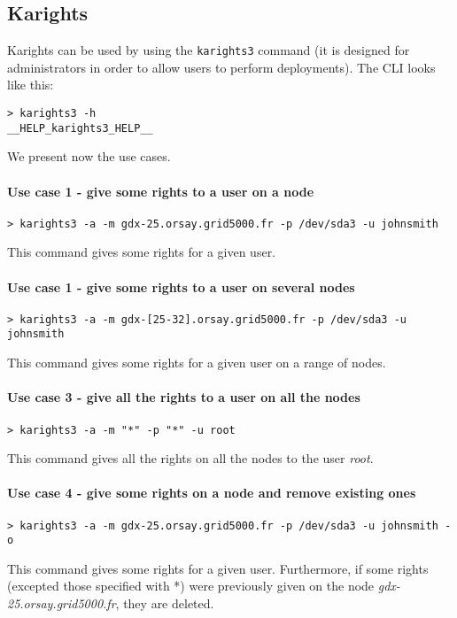 \documentclass[a4wide,10pt,oneside]{book}
\begin{document}
\subsection{Karights}\label{sec:karights}
Karights can be used by using the \texttt{karights3} command (it is designed for administrators in order to allow users to perform deployments). The CLI looks like this:
\begin{small}
\begin{verbatim}
> karights3 -h
__HELP_karights3_HELP__
\end{verbatim}
\end{small}

We present now the use cases.
\paragraph{Use case 1 - give some rights to a user on a node}
\begin{verbatim}
> karights3 -a -m gdx-25.orsay.grid5000.fr -p /dev/sda3 -u johnsmith
\end{verbatim}
This command gives some rights for a given user.

\paragraph{Use case 1 - give some rights to a user on several nodes}
\begin{verbatim}
> karights3 -a -m gdx-[25-32].orsay.grid5000.fr -p /dev/sda3 -u johnsmith
\end{verbatim}
This command gives some rights for a given user on a range of nodes.

\paragraph{Use case 3 - give all the rights to a user on all the nodes}
\begin{verbatim}
> karights3 -a -m "*" -p "*" -u root
\end{verbatim}
This command gives all the rights on all the nodes to the user \textit{root}.

\paragraph{Use case 4 - give some rights on a node and remove existing ones}
\begin{verbatim}
> karights3 -a -m gdx-25.orsay.grid5000.fr -p /dev/sda3 -u johnsmith -o
\end{verbatim}
This command gives some rights for a given user. Furthermore, if some rights (excepted those specified with *) were previously given on the node \textit{gdx-25.orsay.grid5000.fr}, they are deleted.
\end{document}
